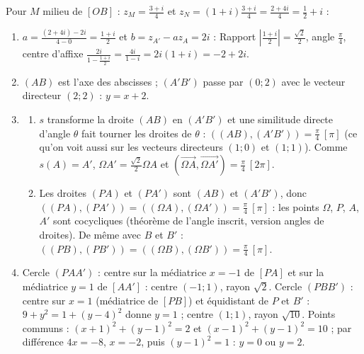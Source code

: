 \begin{corrige}
\begin{sol}
\begin{enumerate}
            Pour $M$ milieu de $[OB]$ : $z_M = \frac{3+i}{4}$ et $z_N = (1+i)\frac{3+i}{4} = \frac{2 + 4i}{4} = \frac12 + i$ :
\end{enumerate}
\end{sol}
\begin{sol}
\begin{enumerate}
      \item $a = \frac{(2+4i) - 2i}{4 - 0} = \frac{1+i}{2}$ et $b = z_{A'} - a z_A = 2i$ : 
            Rapport $\left|\frac{1+i}{2}\right| = \frac{\sqrt2}{2}$, angle $\frac{\pi}{4}$, centre d'affixe
            $\frac{2i}{1 - \frac{1+i}{2}} = \frac{4i}{1-i} = 2i(1+i) = -2 + 2i$. 
      \item $(AB)$ est l'axe des abscisses ; $(A'B')$ passe par $(0;2)$ avec le vecteur directeur $(2;2)$ : $y = x + 2$. 
      \item \begin{enumerate}
                  \item $s$ transforme la droite $(AB)$ en $(A'B')$ et une similitude directe d'angle $\theta$ fait tourner les droites de $\theta$ :
                        $((AB),(A'B')) = \frac{\pi}{4}\ [\pi]$ (ce qu'on voit aussi sur les vecteurs directeurs $(1;0)$ et $(1;1)$).
                        Comme $s(A) = A'$, $\Omega A' = \frac{\sqrt2}{2}\Omega A$ et $(\overrightarrow{\Omega A},\overrightarrow{\Omega A'}) = \frac{\pi}{4}\ [2\pi]$.
                  \item Les droites $(PA)$ et $(PA')$ sont $(AB)$ et $(A'B')$, donc $((PA),(PA')) = ((\Omega A),(\Omega A')) = \frac{\pi}{4}\ [\pi]$ :
                        les points $\Omega$, $P$, $A$, $A'$ sont cocycliques (théorème de l'angle inscrit, version angles de droites).
                        De même avec $B$ et $B'$ : $((PB),(PB')) = ((\Omega B),(\Omega B')) = \frac{\pi}{4}\ [\pi]$.
            \end{enumerate}
      \item Cercle $(PAA')$ : centre sur la médiatrice $x = -1$ de $[PA]$ et sur la médiatrice $y = 1$ de $[AA']$ : centre $(-1;1)$, rayon $\sqrt2$.
            Cercle $(PBB')$ : centre sur $x = 1$ (médiatrice de $[PB]$) et équidistant de $P$ et $B'$ :
            $9 + y^2 = 1 + (y-4)^2$ donne $y = 1$ ; centre $(1;1)$, rayon $\sqrt{10}$.
            Points communs : $(x+1)^2 + (y-1)^2 = 2$ et $(x-1)^2 + (y-1)^2 = 10$ ; par différence $4x = -8$, $x = -2$, puis $(y-1)^2 = 1$ :
            $y = 0$ ou $y = 2$. 


\end{enumerate}
\end{sol}
\end{corrige}
